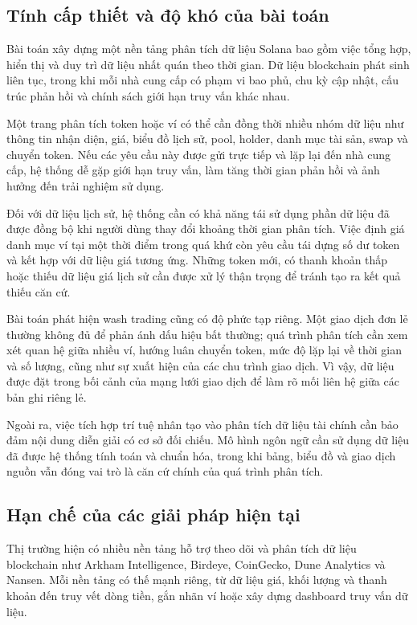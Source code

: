 \subsection{Tính cấp thiết và độ khó của bài toán}

Bài toán xây dựng một nền tảng phân tích dữ liệu Solana bao gồm việc tổng hợp, hiển thị và duy trì dữ liệu nhất quán theo thời gian. Dữ liệu blockchain phát sinh liên tục, trong khi mỗi nhà cung cấp có phạm vi bao phủ, chu kỳ cập nhật, cấu trúc phản hồi và chính sách giới hạn truy vấn khác nhau.

Một trang phân tích token hoặc ví có thể cần đồng thời nhiều nhóm dữ liệu như thông tin nhận diện, giá, biểu đồ lịch sử, pool, holder, danh mục tài sản, swap và chuyển token. Nếu các yêu cầu này được gửi trực tiếp và lặp lại đến nhà cung cấp, hệ thống dễ gặp giới hạn truy vấn, làm tăng thời gian phản hồi và ảnh hưởng đến trải nghiệm sử dụng.

Đối với dữ liệu lịch sử, hệ thống cần có khả năng tái sử dụng phần dữ liệu đã được đồng bộ khi người dùng thay đổi khoảng thời gian phân tích. Việc định giá danh mục ví tại một thời điểm trong quá khứ còn yêu cầu tái dựng số dư token và kết hợp với dữ liệu giá tương ứng. Những token mới, có thanh khoản thấp hoặc thiếu dữ liệu giá lịch sử cần được xử lý thận trọng để tránh tạo ra kết quả thiếu căn cứ.

Bài toán phát hiện wash trading cũng có độ phức tạp riêng. Một giao dịch đơn lẻ thường không đủ để phản ánh dấu hiệu bất thường; quá trình phân tích cần xem xét quan hệ giữa nhiều ví, hướng luân chuyển token, mức độ lặp lại về thời gian và số lượng, cũng như sự xuất hiện của các chu trình giao dịch. Vì vậy, dữ liệu được đặt trong bối cảnh của mạng lưới giao dịch để làm rõ mối liên hệ giữa các bản ghi riêng lẻ.

Ngoài ra, việc tích hợp trí tuệ nhân tạo vào phân tích dữ liệu tài chính cần bảo đảm nội dung diễn giải có cơ sở đối chiếu. Mô hình ngôn ngữ cần sử dụng dữ liệu đã được hệ thống tính toán và chuẩn hóa, trong khi bảng, biểu đồ và giao dịch nguồn vẫn đóng vai trò là căn cứ chính của quá trình phân tích.

\subsection{Hạn chế của các giải pháp hiện tại}

Thị trường hiện có nhiều nền tảng hỗ trợ theo dõi và phân tích dữ liệu blockchain như Arkham Intelligence, Birdeye, CoinGecko, Dune Analytics và Nansen. Mỗi nền tảng có thế mạnh riêng, từ dữ liệu giá, khối lượng và thanh khoản đến truy vết dòng tiền, gắn nhãn ví hoặc xây dựng dashboard truy vấn dữ liệu.

